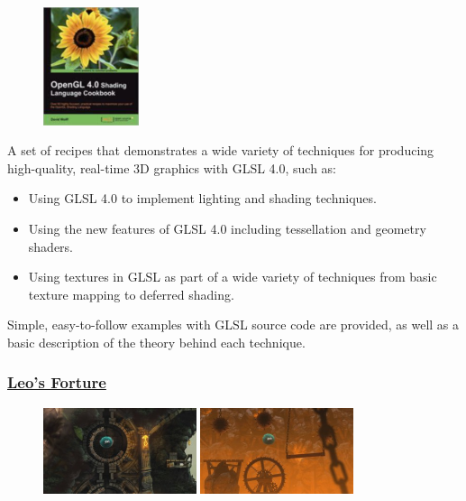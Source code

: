 \documentclass{scrartcl}
\numberwithin{figure}{subsection}
\begin{document}
\begin{figure}
  \includegraphics[width=0.25\textwidth, right]{glsl4book}
\end{figure}

A set of recipes that demonstrates a wide variety of techniques for producing high-quality, real-time 3D graphics with GLSL 4.0, such as:

\begin{itemize}
  \item Using GLSL 4.0 to implement lighting and shading techniques.
  \item Using the new features of GLSL 4.0 including tessellation and geometry shaders.
  \item Using textures in GLSL as part of a wide variety of techniques from basic texture mapping to deferred shading.
\end{itemize}

Simple, easy-to-follow examples with GLSL source code are provided, as well as a basic description of the theory behind each technique.

\subsubsection{\href{http://www.leosfortune.com/}{Leo's Forture}}

\begin{figure}
  \includegraphics[width=0.4\textwidth, right]{leosfortune}
  \includegraphics[width=0.4\textwidth, right]{leosfortune2}
\end{figure}
\end{document}

